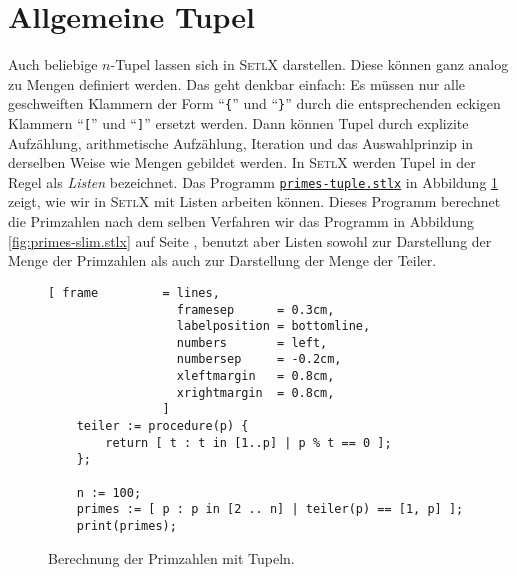 \section{Allgemeine Tupel}
Auch beliebige $n$-Tupel lassen sich in \textsc{SetlX} darstellen.  Diese k\"{o}nnen
ganz analog zu Mengen definiert werden.  Das geht denkbar einfach: Es m\"{u}ssen nur
alle geschweiften Klammern der Form ``\texttt{\{}'' und ``\texttt{\}}'' durch
die entsprechenden eckigen Klammern ``\texttt{[}'' und ``\texttt{]}'' ersetzt
werden.  Dann k\"{o}nnen Tupel durch explizite Aufz\"{a}hlung, arithmetische Aufz\"{a}hlung, Iteration und das
Auswahlprinzip in derselben Weise wie Mengen gebildet werden.  In \textsc{SetlX} werden Tupel in
der Regel als \emph{Listen} bezeichnet.  Das Programm 
\href{https://github.com/karlstroetmann/Logik/blob/master/SetlX/primes-tuple.stlx}{\texttt{primes-tuple.stlx}}
in Abbildung \ref{fig:primes-tuple.stlx} zeigt, wie wir in \textsc{SetlX} mit Listen arbeiten
k\"{o}nnen.  Dieses Programm berechnet die Primzahlen nach dem selben 
Verfahren wir das Programm in Abbildung \ref{fig:primes-slim.stlx} auf Seite
\pageref{fig:primes-slim.stlx}, benutzt aber Listen sowohl zur Darstellung der Menge der Primzahlen als auch
zur Darstellung der Menge der Teiler.

\begin{figure}[!ht]
  \centering
\begin{Verbatim}[ frame         = lines, 
                  framesep      = 0.3cm, 
                  labelposition = bottomline,
                  numbers       = left,
                  numbersep     = -0.2cm,
                  xleftmargin   = 0.8cm,
                  xrightmargin  = 0.8cm,
                ]
    teiler := procedure(p) {
        return [ t : t in [1..p] | p % t == 0 ];
    };
    
    n := 100;
    primes := [ p : p in [2 .. n] | teiler(p) == [1, p] ];
    print(primes);
\end{Verbatim} 
\vspace*{-0.3cm}
\caption{Berechnung der Primzahlen mit Tupeln.}  
\label{fig:primes-tuple.stlx}
\end{figure} %

